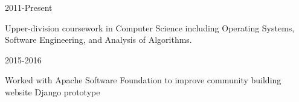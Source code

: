 \documentclass[11pt]{article} %
\begin{document}

\begin{description}
\squish
{}
           {}
           {2011-Present}

Upper-division coursework in Computer Science including Operating Systems,\\
Software Engineering, and Analysis of Algorithms.


           {}
           {2015-2016}

Worked with Apache Software Foundation to improve community building website
Django prototype

\end{description}
\end{document}
